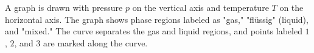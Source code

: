 A graph is drawn with pressure \( p \) on the vertical axis and temperature \( T \) on the horizontal axis. The graph shows phase regions labeled as "gas," "flüssig" (liquid), and "mixed." The curve separates the gas and liquid regions, and points labeled \( 1 \), \( 2 \), and \( 3 \) are marked along the curve.